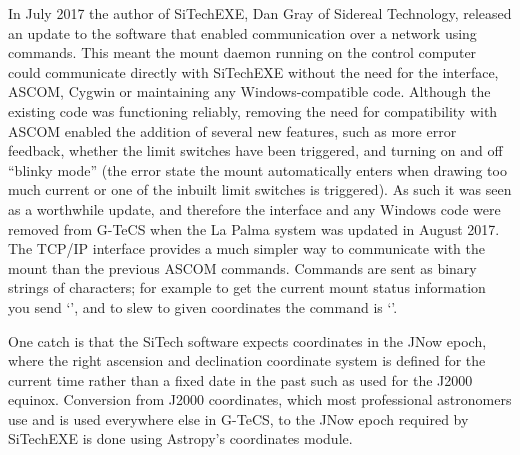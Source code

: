 \begin{colsection}
In July 2017 the author of SiTechEXE, Dan Gray of Sidereal Technology, released an update to the software that enabled communication over a network using  commands. This meant the mount daemon running on the control computer could communicate directly with SiTechEXE without the need for the  interface, ASCOM, Cygwin or maintaining any Windows-compatible code. Although the existing code was functioning reliably, removing the need for compatibility with ASCOM enabled the addition of several new features, such as more error feedback, whether the limit switches have been triggered, and turning on and off ``blinky mode'' (the error state the mount automatically enters when drawing too much current or one of the inbuilt limit switches is triggered). As such it was seen as a worthwhile update, and therefore the  interface and any Windows code were removed from G-TeCS when the La Palma system was updated in August 2017. The TCP/IP interface provides a much simpler way to communicate with the mount than the previous ASCOM commands. Commands are sent as binary strings of characters; for example to get the current mount status information you send `', and to slew to given coordinates the command is `'.

One catch is that the SiTech software expects coordinates in the JNow epoch, where the right ascension and declination coordinate system is defined for the current time rather than a fixed date in the past such as used for the J2000 equinox. Conversion from J2000 coordinates, which most professional astronomers use and is used everywhere else in G-TeCS, to the JNow epoch required by SiTechEXE is done using Astropy's coordinates module.

\end{colsection}


